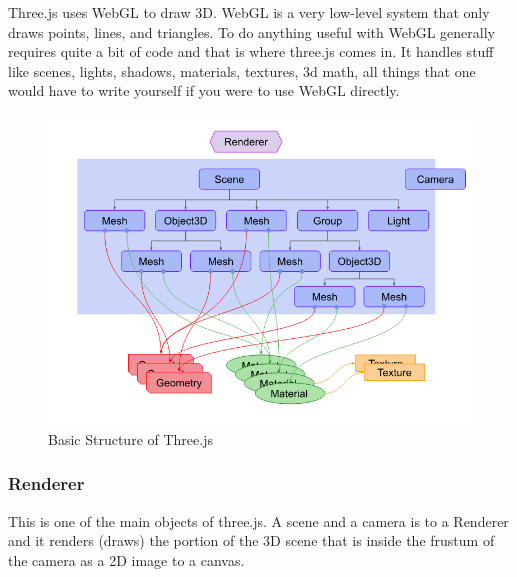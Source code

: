 \documentclass{article}
\begin{document}
	Three.js uses WebGL to draw 3D. WebGL is a very low-level system that only draws points, lines, and triangles. To do anything useful with WebGL generally requires quite a bit of code and that is where three.js comes in. It handles stuff like scenes, lights, shadows, materials, textures, 3d math, all things that one would have to write yourself if you were to use WebGL directly. \cite{threejsfundamentals} 

	   \begin{figure}[H]
            \centering
            \includegraphics[width=15cm]{images/threeDotJS/threeJsStructure.png}
            \caption{Basic Structure of Three.js}
        \end{figure}
    \subsubsection{Renderer}
    This is one of the main objects of three.js. A scene and a camera is to a Renderer and it renders (draws) the portion of the 3D scene that is inside the frustum of the camera as a 2D image to a canvas.
\end{document}
